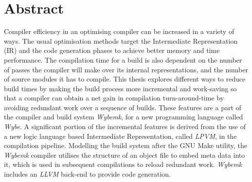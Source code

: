 \chapter{Abstract}

Compiler efficiency in an optimising compiler can be increased in a variety of
ways. The usual optimisation methods target the Intermediate Representation
(IR) and the code generation phases to achieve better memory and time
performance. The compilation time for a build is also dependent on the number
of passes the compiler will make over its internal representations, and the
number of source modules it has to compile. This thesis explores different ways
to reduce build times by making the build process more incremental and
work-saving so that a compiler can obtain a net gain in compilation
turn-around-time by avoiding redundant work over a sequence of builds. These
features are a part of the compiler and build system \textit{Wybemk}, for a new
programming language called \textit{Wybe}. A significant portion of the
incremental features is derived from the use of a new logic language based
Intermediate Representation, called \textit{LPVM}, in the compilation
pipeline. Modelling the build system after the GNU Make utility, the
\textit{Wybemk} compiler utilises the structure of an object file to embed meta
data into it, which is used in subsequent compilations to reload redundant
work. \textit{Wybemk} includes an \textit{LLVM} back-end to provide code
generation.

